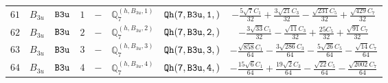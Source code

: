 \documentclass[fleqn,8pt]{jsarticle}
\begin{document}
\begin{table}[ht!]
\begin{center}
\begin{tabular}{cccccccc}
$ 61 $ & $ B_{3u} $ & $ {\tt B3u} $ & $ 1 $ & $ - $ & $ \mathbb{Q}_{7}^{(h,B_{3u},1)} $ & $ {\tt Qh(7,B3u,1,)} $ & $ - \frac{5 \sqrt{7} C_{1}}{32} + \frac{3 \sqrt{21} C_{3}}{32} - \frac{\sqrt{231} C_{5}}{32} + \frac{\sqrt{429} C_{7}}{32} $ \\
$ 62 $ & $ B_{3u} $ & $ {\tt B3u} $ & $ 2 $ & $ - $ & $ \mathbb{Q}_{7}^{(h,B_{3u},2)} $ & $ {\tt Qh(7,B3u,2,)} $ & $ - \frac{3 \sqrt{33} C_{1}}{32} - \frac{\sqrt{11} C_{3}}{32} + \frac{25 C_{5}}{32} + \frac{\sqrt{91} C_{7}}{32} $ \\
$ 63 $ & $ B_{3u} $ & $ {\tt B3u} $ & $ 3 $ & $ - $ & $ \mathbb{Q}_{7}^{(h,B_{3u},3)} $ & $ {\tt Qh(7,B3u,3,)} $ & $ - \frac{\sqrt{858} C_{1}}{64} - \frac{3 \sqrt{286} C_{3}}{64} - \frac{5 \sqrt{26} C_{5}}{64} - \frac{\sqrt{14} C_{7}}{64} $ \\
$ 64 $ & $ B_{3u} $ & $ {\tt B3u} $ & $ 4 $ & $ - $ & $ \mathbb{Q}_{7}^{(h,B_{3u},4)} $ & $ {\tt Qh(7,B3u,4,)} $ & $ - \frac{15 \sqrt{6} C_{1}}{64} + \frac{19 \sqrt{2} C_{3}}{64} - \frac{\sqrt{22} C_{5}}{64} - \frac{\sqrt{2002} C_{7}}{64} $ \\
 \hline \hline
\end{tabular}
\end{center}
\end{table}
\end{document}

